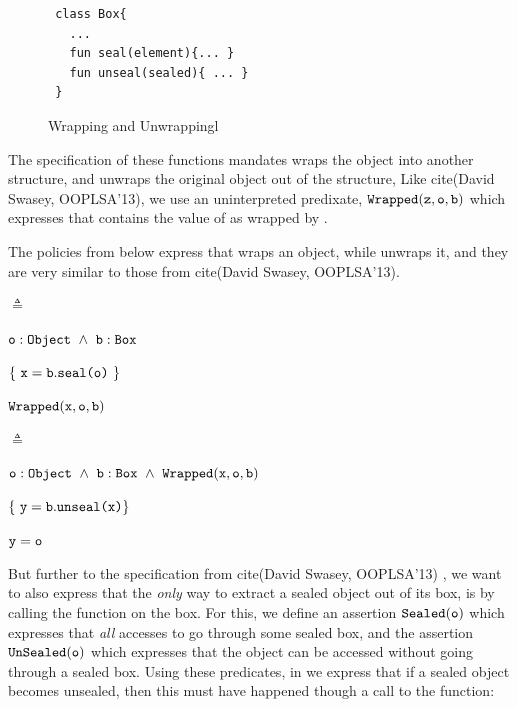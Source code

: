 \documentclass[acmsmall,screen]{acmart}
\begin{document}
\begin{figure}[tbp]
\begin{lstlisting}
 class Box{
   ...
   fun seal(element){... }
   fun unseal(sealed){ ... }
 }

\end{lstlisting}
\caption{Wrapping and Unwrappingl}
\label{fig:WrapUnwrap}
 \end{figure}

The specification of these functions mandates  wraps the object into another structure, and  unwraps the original object out of the structure, Like cite(David Swasey, OOPLSA'13), we use an uninterpreted  predixate, ${\mbox{\tt{Wrapped}}}({\mbox{\tt{z}}},{\mbox{\tt{o}}},{\mbox{\tt{b}}})$ which expresses that  contains the value of  as wrapped by .

The policies from below express that  wraps an object, while  unwraps it, and they are very similar to those from cite(David Swasey, OOPLSA'13).

 $\triangleq$
\strut \hspace{2.1cm} $\prg{o}:\prg{Object}\ \wedge\ \prg{b}:\prg{Box}$  \\
\strut \hspace{6cm}$\{\ \prg{x} = \prg{b}.\prg{seal}\prg{(o)}\ \}$\\
\strut \hspace{5cm} ${\mbox{\tt{Wrapped}}}({\mbox{\tt{x}}},{\mbox{\tt{o}}},{\mbox{\tt{b}}})$

\hspace{.1cm}

 $\triangleq$
\strut \hspace{2.2cm}$\prg{o}:\prg{Object}\ \wedge\ \prg{b}:\prg{Box}\  \wedge\  \prg{Wrapped}(\prg{x},\prg{o},\prg{b})$\\
\strut \hspace{6cm}$ \{\ {\mbox{\tt{y}}} = {\mbox{\tt{b}}}.{\mbox{\tt{unseal}}}{\mbox{\tt{(x)}}} \}$\\
\strut \hspace{5cm} ${\mbox{\tt{y}}}={\mbox{\tt{o}}}$

\hspace{.1cm}

But further to the specification from cite(David Swasey, OOPLSA'13) ,
we want to also express that the {\em only} way to extract a sealed object
 out of its box, is by calling the  function on the box. For this, we
 define an assertion ${\mbox{\tt{Sealed}}}({\mbox{\tt{o}}})$ which expresses that {\em all} accesses to 
go through some sealed box, and the assertion ${\mbox{\tt{UnSealed}}}({\mbox{\tt{o}}})$ which expresses that the object can be accessed without
going through a sealed box. Using these predicates, in   we express that if a sealed object
becomes unsealed, then this must have happened though a call to the  function:
\end{document}
